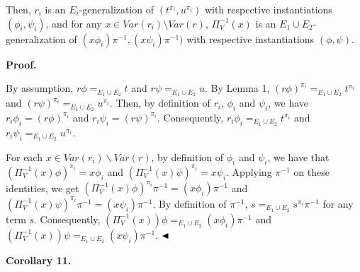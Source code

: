  
  
 
  
Then, $r_{i}$ is an $E_{i}$-generalization of $(t^{\pi_{i}},u^{\pi_{i}})$ with respective instantiations $(\phi_{i},\psi_{i})$, and for any $x\in\mathit{Var}(r_{i})\setminus\mathit{Var}(r)$, $\Pi_{V}^{-1}(x)$ is an $E_{1}\cup E_{2}$-generalization of $(x\phi_{i})\pi^{-1},(x\psi_{i})\pi^{-1})$ with respective instantiations $(\phi,\psi)$.\par
 
 
 
 
 
\par\medskip\noindent\textbf{Proof.}\par
 
 
By assumption, $r\phi=_{E_{1}\cup E_{2}}t$ and $r\psi=_{E_{1}\cup E_{2}}u$. By Lemma 1, $(r\phi)^{\pi_{i}}=_{E_{1}\cup E_{2}}t^{\pi_{i}}$ and $(r\psi)^{\pi_{i}}=_{E_{1}\cup E_{2}}u^{\pi_{i}}$. Then, by definition of $r_{i}$, $\phi_{i}$ and $\psi_{i}$, we have $r_{i}\phi_{i}=(r\phi)^{\pi_{i}}$ and $r_{i}\psi_{i}=(r\psi)^{\pi_{i}}$. Consequently, $r_{i}\phi_{i}=_{E_{1}\cup E_{2}}t^{\pi_{i}}$ and $r_{i}\psi_{i}=_{E_{1}\cup E_{2}}u^{\pi_{i}}$.\par
 
 
 
For each $x\in\mathit{Var}(r_{i})\backslash\mathit{Var}(r)$, by definition of $\phi_{i}$ and $\psi_{i}$, we have that $(\Pi_{V}^{-1}(x)\phi)^{\pi_{i}}=x\phi_{i}$ and $(\Pi_{V}^{-1}(x)\psi)^{\pi_{i}}=x\psi_{i}$. Applying $\pi^{-1}$ on these identities, we get $(\Pi_{V}^{-1}(x)\phi)^{\pi_{i}}\pi^{-1}=(x\phi_{i})\pi^{-1}$ and $(\Pi_{V}^{-1}(x)\psi)^{\pi_{i}}\pi^{-1}=(x\psi_{i})\pi^{-1}$. By definition of $\pi^{-1}$, $s=_{E_{1}\cup E_{2}}s^{\pi_{i}}\pi^{-1}$ for any term $s$. Consequently, $(\Pi_{V}^{-1}(x))\phi=_{E_{1}\cup E_{2}}(x\phi_{i})\pi^{-1}$ and $(\Pi_{V}^{-1}(x))\psi=_{E_{1}\cup E_{2}}(x\psi_{i})\pi^{-1}$. $\hfill\blacktriangleleft$\par
 
 
 
\par\medskip\noindent\textbf{Corollary 11.}\par
 
